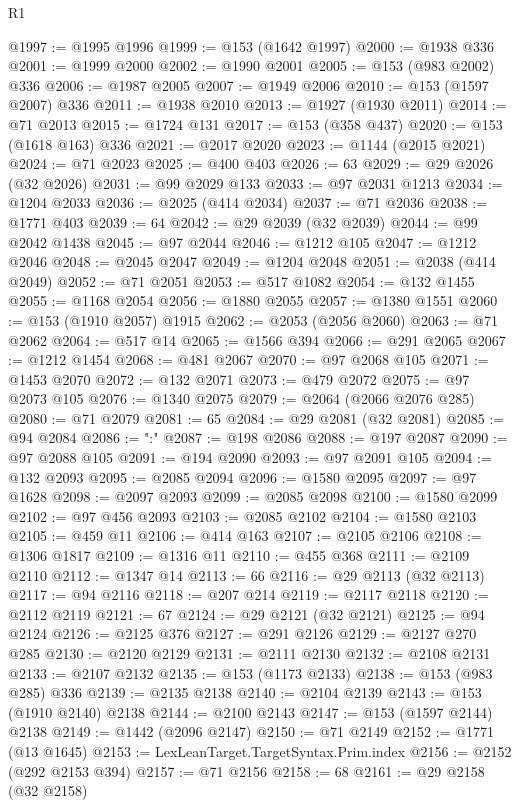\begin{lexlean}{R1}
\begin{coremodule}
@1997 := @1995 @1996
@1999 := @153 (@1642 @1997)
@2000 := @1938 @336
@2001 := @1999 @2000
@2002 := @1990 @2001
@2005 := @153 (@983 @2002) @336
@2006 := @1987 @2005
@2007 := @1949 @2006
@2010 := @153 (@1597 @2007) @336
@2011 := @1938 @2010
@2013 := @1927 (@1930 @2011)
@2014 := @71 @2013
@2015 := @1724 @131
@2017 := @153 (@358 @437)
@2020 := @153 (@1618 @163) @336
@2021 := @2017 @2020
@2023 := @1144 (@2015 @2021)
@2024 := @71 @2023
@2025 := @400 @403
@2026 := 63
@2029 := @29 @2026 (@32 @2026)
@2031 := @99 @2029 @133
@2033 := @97 @2031 @1213
@2034 := @1204 @2033
@2036 := @2025 (@414 @2034)
@2037 := @71 @2036
@2038 := @1771 @403
@2039 := 64
@2042 := @29 @2039 (@32 @2039)
@2044 := @99 @2042 @1438
@2045 := @97 @2044
@2046 := @1212 @105
@2047 := @1212 @2046
@2048 := @2045 @2047
@2049 := @1204 @2048
@2051 := @2038 (@414 @2049)
@2052 := @71 @2051
@2053 := @517 @1082
@2054 := @132 @1455
@2055 := @1168 @2054
@2056 := @1880 @2055
@2057 := @1380 @1551
@2060 := @153 (@1910 @2057) @1915
@2062 := @2053 (@2056 @2060)
@2063 := @71 @2062
@2064 := @517 @14
@2065 := @1566 @394
@2066 := @291 @2065
@2067 := @1212 @1454
@2068 := @481 @2067
@2070 := @97 @2068 @105
@2071 := @1453 @2070
@2072 := @132 @2071
@2073 := @479 @2072
@2075 := @97 @2073 @105
@2076 := @1340 @2075
@2079 := @2064 (@2066 @2076 @285)
@2080 := @71 @2079
@2081 := 65
@2084 := @29 @2081 (@32 @2081)
@2085 := @94 @2084
@2086 := ":"
@2087 := @198 @2086
@2088 := @197 @2087
@2090 := @97 @2088 @105
@2091 := @194 @2090
@2093 := @97 @2091 @105
@2094 := @132 @2093
@2095 := @2085 @2094
@2096 := @1580 @2095
@2097 := @97 @1628
@2098 := @2097 @2093
@2099 := @2085 @2098
@2100 := @1580 @2099
@2102 := @97 @456 @2093
@2103 := @2085 @2102
@2104 := @1580 @2103
@2105 := @459 @11
@2106 := @414 @163
@2107 := @2105 @2106
@2108 := @1306 @1817
@2109 := @1316 @11
@2110 := @455 @368
@2111 := @2109 @2110
@2112 := @1347 @14
@2113 := 66
@2116 := @29 @2113 (@32 @2113)
@2117 := @94 @2116
@2118 := @207 @214
@2119 := @2117 @2118
@2120 := @2112 @2119
@2121 := 67
@2124 := @29 @2121 (@32 @2121)
@2125 := @94 @2124
@2126 := @2125 @376
@2127 := @291 @2126
@2129 := @2127 @270 @285
@2130 := @2120 @2129
@2131 := @2111 @2130
@2132 := @2108 @2131
@2133 := @2107 @2132
@2135 := @153 (@1173 @2133)
@2138 := @153 (@983 @285) @336
@2139 := @2135 @2138
@2140 := @2104 @2139
@2143 := @153 (@1910 @2140) @2138
@2144 := @2100 @2143
@2147 := @153 (@1597 @2144) @2138
@2149 := @1442 (@2096 @2147)
@2150 := @71 @2149
@2152 := @1771 (@13 @1645)
@2153 := LexLeanTarget.TargetSyntax.Prim.index
@2156 := @2152 (@292 @2153 @394)
@2157 := @71 @2156
@2158 := 68
@2161 := @29 @2158 (@32 @2158)

\end{coremodule}
\end{lexlean}
